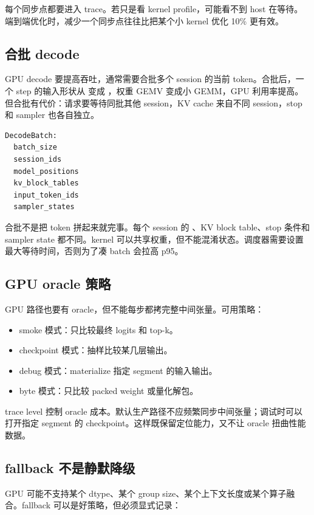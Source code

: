 每个同步点都要进入 trace。若只是看 kernel profile，可能看不到 host 在等待。端到端优化时，减少一个同步点往往比把某个小 kernel 优化 10\% 更有效。

\subsection{合批 decode}

GPU decode 要提高吞吐，通常需要合批多个 session 的当前 token。合批后，一个 step 的输入形状从 \code{[1,H]} 变成 \code{[B,H]}，权重 GEMV 变成小 GEMM，GPU 利用率提高。但合批有代价：请求要等待同批其他 session，KV cache 来自不同 session，stop 和 sampler 也各自独立。

\begin{lstlisting}[numbers=none,caption={GPU decode 合批元数据}]
DecodeBatch:
  batch_size
  session_ids
  model_positions
  kv_block_tables
  input_token_ids
  sampler_states
\end{lstlisting}

合批不是把 token 拼起来就完事。每个 session 的 、KV block table、stop 条件和 sampler state 都不同。kernel 可以共享权重，但不能混淆状态。调度器需要设置最大等待时间，否则为了凑 batch 会拉高 p95。

\subsection{GPU oracle 策略}

GPU 路径也要有 oracle，但不能每步都拷完整中间张量。可用策略：

\begin{itemize}
  \item smoke 模式：只比较最终 logits 和 top-k。
  \item checkpoint 模式：抽样比较某几层输出。
  \item debug 模式：materialize 指定 segment 的输入输出。
  \item byte 模式：只比较 packed weight 或量化解包。
\end{itemize}

trace level 控制 oracle 成本。默认生产路径不应频繁同步中间张量；调试时可以打开指定 segment 的 checkpoint。这样既保留定位能力，又不让 oracle 扭曲性能数据。

\subsection{fallback 不是静默降级}

GPU 可能不支持某个 dtype、某个 group size、某个上下文长度或某个算子融合。fallback 可以是好策略，但必须显式记录：

